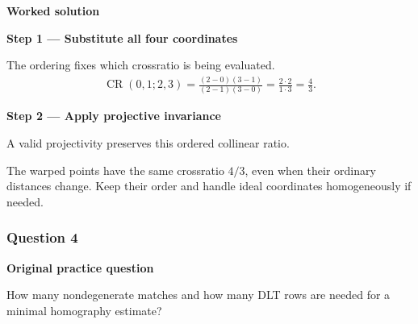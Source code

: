 \documentclass[letterpaper,11pt,english,openany,oneside]{jupyterBook}
\begin{document}
\par\medskip

\par\medskip
\textbf{Worked solution}\par\smallskip

\par\medskip{}
{\color{QuizStepRed}\bfseries Step 1 — Substitute all four coordinates}\par\smallskip

\sphinxAtStartPar
{} The ordering fixes which cross\sphinxhyphen{}ratio is being evaluated.
{\color{QuizMathBlue} \begin{equation*}
\begin{split}
\operatorname{CR}(0,1;2,3)=\frac{(2-0)(3-1)}{(2-1)(3-0)}=\frac{2\cdot2}{1\cdot3}=\frac43.
\end{split}
\end{equation*}}
\par

\par\medskip{}
{\color{QuizStepRed}\bfseries Step 2 — Apply projective invariance}\par\smallskip

\sphinxAtStartPar
{} A valid projectivity preserves this ordered collinear ratio.

\sphinxAtStartPar
The warped points have the same cross\sphinxhyphen{}ratio {\color{QuizMathBlue} \(4/3\)}, even when their ordinary distances change. Keep their order and handle ideal coordinates homogeneously if needed.

\par

\par\medskip


\subsubsection{Question 4}
\label{\detokenize{lectures/lecture02/tldr:question-4}}\label{\detokenize{lectures/lecture02/tldr:lec02-tldr-q4}}
\par\medskip\textbf{Original practice question}\par\smallskip

\sphinxAtStartPar
How many nondegenerate matches and how many DLT rows are needed for a minimal homography estimate?

\par\medskip
\end{document}
